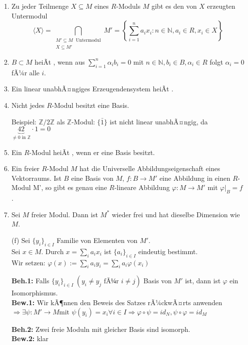 \begin{Bem}
  \begin{enumerate}
    \item Zu jeder Teilmenge $X \subseteq M$ eines $R$-Moduls $M$ gibt es den von
          $X$ erzeugten Untermodul $$\langle X \rangle = \displaystyle 
          \bigcap_{\substack{M' \subseteq M\; \text{ Untermodul} \\ X \subseteq M'}} M' = \left\{
          \sum_{i=1}^n a_i x_i: n \in \mathbb{N}, a_i \in R, x_i \in X \right\}$$
    \item $B \subset M$ heiÃt ,
          wenn aus $\displaystyle \sum_{i=1}^n \alpha_i b_i = 0$ mit $n \in
          \mathbb{N}, b_i \in B, \alpha_i \in R$ folgt $\alpha_i = 0$ fÃ¼r alle
          $i$.
    \item Ein linear unabhÃ¤ngiges Erzeugendensystem heiÃt
          .
    \item Nicht jedes $R$-Modul besitzt eine Basis.

          Beispiel: $\mathbb{Z}/2\mathbb{Z}$ als $\mathbb{Z}$-Modul: $\{\bar{1}\}$
          ist nicht linear unabhÃ¤ngig, da $\underbrace{42}_{\not= 0 \text{ in } \mathbb{Z}} \cdot 1 = 0$
    \item Ein $R$-Modul heiÃt , wenn er eine
          Basis besitzt.
    \item Ein freier $R$-Modul $M$ hat die Universelle Abbildungseigenschaft eines Vektorraums. Ist $B$ eine
          Basis von $M$, $f: B \to M'$ eine Abbildung in einen $R$-Modul M', so
          gibt es genau eine $R$-lineare Abbildung $\varphi: M \to M'$ mit
          $\varphi|_B = f$.
    \item Sei $M$ freier Modul. Dann ist $M^*$ wieder frei und hat dieselbe
          Dimension wie $M$.
  \end{enumerate}
\end{Bem}

\begin{Bew}
  \begin{enumerate}
    \item[(f)] Sei $\{y_i\}_{i \in I}$ Familie von Elementen von $M'$.\\
			   Sei $x \in M$. Durch $x=\sum_{i}a_ix_i$ ist $\{a_i\}_{i  \in I}$
			   eindeutig bestimmt.\\
			   Wir setzen: $\varphi(x):=\sum_i a_iy_i=\sum_ia_i\varphi(x_i)$

			   \textbf{Beh.1:} Falls $\{y_i\}_{i\in I}\;(y_i \neq y_j \mbox{ fÃ¼r } i\neq
			   j)$ Basis von $M'$ ist, dann ist $\varphi$ ein Isomorphismus.\\
			   \textbf{Bew.1:} Wir kÃ¶nnen den Beweis des Satzes rÃ¼ckwÃ¤rts anwenden $\Rightarrow \exists \psi:
			   M' \rightarrow M \text{mit } \psi(y_i)=x_i \forall i \in I \Rightarrow
			   \varphi \circ \psi = id_N, \psi \circ \varphi = id_M$

   			   \textbf{Beh.2:} Zwei freie Moduln mit gleicher Basis sind
  			   isomorph.\\
  			   \textbf{Bew.2:} klar
  \end{enumerate}
\end{Bew}

